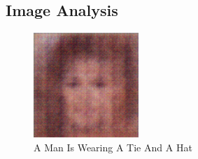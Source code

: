 \documentclass{article}%
\begin{document}
%
\subsection{Image Analysis}%
\label{subsec:ImageAnalysis}%


\begin{figure}[h!]%
\centering%
\includegraphics[width=150px]{500_fake_images/samples_5_6.png}%
\caption{A Man Is Wearing A Tie And A Hat}%
\end{figure}

%
\end{document}
